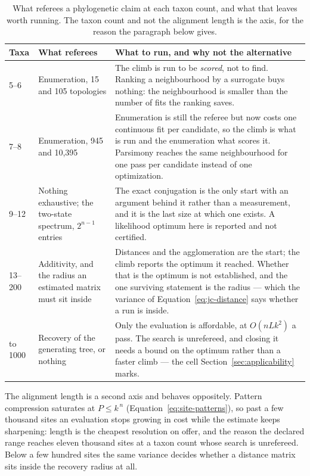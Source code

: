 \documentclass[11pt,a4paper]{article}
\begin{document}
\begin{table}[htbp]
  \centering
  \footnotesize
  \begin{tabular}{@{}p{}p{}p{}@{}}
    \toprule
    Taxa & What referees & What to run, and why not the alternative \\
    \midrule
    5--6 & Enumeration, 15 and 105 topologies
      & The climb is run to be \emph{scored}, not to find. Ranking a
        neighbourhood by a surrogate buys nothing: the neighbourhood is
        smaller than the number of fits the ranking saves. \\
    7--8 & Enumeration, 945 and 10{,}395
      & Enumeration is still the referee but now costs one continuous fit
        per candidate, so the climb is what is run and the enumeration what
        scores it. Parsimony reaches the same neighbourhood for one pass
        per candidate instead of one optimization. \\
    9--12 & Nothing exhaustive; the two-state spectrum, $2^{n-1}$ entries
      & The exact conjugation is the only start with an argument behind it
        rather than a measurement, and it is the last size at which one
        exists. A likelihood optimum here is reported and not certified. \\
    13--200 & Additivity, and the radius an estimated matrix must sit
        inside
      & Distances and the agglomeration are the start; the climb reports
        the optimum it reached. Whether that is the optimum is not
        established, and the one surviving statement is the radius --- which
        the variance of Equation~\ref{eq:jc-distance} says whether a run is
        inside. \\
    to 1000 & Recovery of the generating tree, or nothing
      & Only the evaluation is affordable, at $O(n L k^2)$ a pass. The
        search is unrefereed, and closing it needs a bound on the optimum
        rather than a faster climb --- the cell
        Section~\ref{sec:applicability} marks. \\
    \bottomrule
  \end{tabular}
  \caption{What referees a phylogenetic claim at each taxon count, and what
  that leaves worth running. The taxon count and not the alignment length is
  the axis, for the reason the paragraph below gives.}
  \label{tab:phylo:regimes}
\end{table}

The alignment length is a second axis and behaves oppositely. Pattern
compression saturates at $P \le k^{\,n}$ (Equation~\ref{eq:site-patterns}), so
past a few thousand sites an evaluation stops growing in cost while the
estimate keeps sharpening: length is the cheapest resolution on offer, and the
reason the declared range reaches eleven thousand sites at a taxon count whose
search is unrefereed. Below a few hundred sites the same variance decides
whether a distance matrix sits inside the recovery radius at all.
\end{document}
